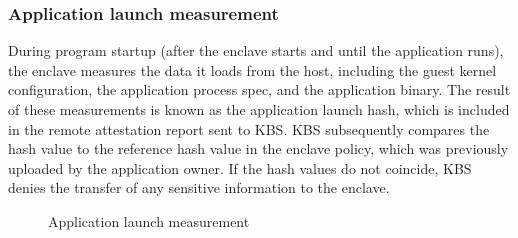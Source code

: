 \subsubsection{Application launch measurement}
During program startup (after the enclave starts and until the application runs), the enclave measures the data it loads from the host, including the guest kernel configuration, the application process spec, and the application binary. The result 
of these measurements is known as the application launch hash, which is included in the remote attestation report sent to KBS. KBS subsequently compares the hash value to the reference hash value in the enclave policy, which was previously uploaded 
by the application owner. If the hash values do not coincide, KBS denies the transfer of any sensitive information to the enclave.
\begin{figure}[H]

    
    
    \caption[Application launch measurement demo]{Application launch measurement}
    \label{fig:cquark_launch_measurement}
\end{figure}

